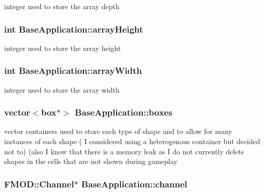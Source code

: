 integer used to store the array depth \hypertarget{class_base_application_a6a0a6b2fd0467a5d206da0a60c68b660}{
\subsubsection[{array\-Height}]{\setlength{\rightskip}{0pt plus 5cm}int Base\-Application\-::array\-Height\hspace{0.3cm}{\ttfamily [protected]}}}\label{class_base_application_a6a0a6b2fd0467a5d206da0a60c68b660}
integer used to store the array height \hypertarget{class_base_application_a7d8a377aa221a84cdf095927bcb48526}{
\subsubsection[{array\-Width}]{\setlength{\rightskip}{0pt plus 5cm}int Base\-Application\-::array\-Width\hspace{0.3cm}{\ttfamily [protected]}}}\label{class_base_application_a7d8a377aa221a84cdf095927bcb48526}
integer used to store the array width \hypertarget{class_base_application_ade32bf8c002709296ed8d0a789d8cbba}{
\subsubsection[{boxes}]{\setlength{\rightskip}{0pt plus 5cm}vector$<${\bf box}$\ast$$>$ Base\-Application\-::boxes\hspace{0.3cm}{\ttfamily [protected]}}}\label{class_base_application_ade32bf8c002709296ed8d0a789d8cbba}
vector containers used to store each type of shape and to allow for many instances of each shape ( I considered using a heterogenous container but decided not to) (also I know that there is a memory leak as I do not currently delete shapes in the cells that are not shown during gameplay \hypertarget{class_base_application_ab6938e41749182bbe867f455ad52cf09}{
\subsubsection[{channel}]{\setlength{\rightskip}{0pt plus 5cm}F\-M\-O\-D\-::\-Channel$\ast$ Base\-Application\-::channel\hspace{0.3cm}{\ttfamily [protected]}}}\label{class_base_application_ab6938e41749182bbe867f455ad52cf09}

